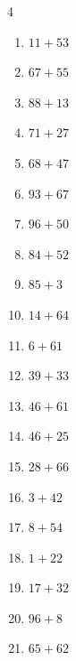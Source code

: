 \begin{multicols}{4}
\begin{enumerate}
  \item $11+53$
        \phantom{$=64$}

  \item $67+55$
        \phantom{$=122$}

  \item $88+13$
        \phantom{$=101$}

  \item $71+27$
        \phantom{$=98$}

\columnbreak %

\resetques

  \item $68+47$
        \phantom{$=115$}

  \item $93+67$
        \phantom{$=160$}

  \item $96+50$
        \phantom{$=146$}

  \item $84+52$
        \phantom{$=136$}

  \item $85+3$
        \phantom{$=88$}

  \item $14+64$
        \phantom{$=78$}

  \item $6+61$
        \phantom{$=67$}

  \item $39+33$
        \phantom{$=72$}

  \item $46+61$
        \phantom{$=107$}

  \item $46+25$
        \phantom{$=71$}

  \item $28+66$
        \phantom{$=94$}

  \item $3+42$
        \phantom{$=45$}

  \item $8+54$
        \phantom{$=62$}

  \item $1+22$
        \phantom{$=23$}

  \item $17+32$
        \phantom{$=49$}

  \item $96+8$
        \phantom{$=104$}

  \item $65+62$
        \phantom{$=127$}


\end{enumerate}
\end{multicols}
